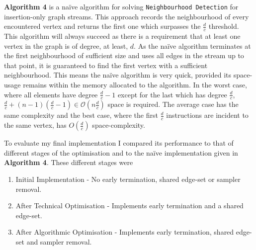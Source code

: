 \documentclass[11pt,twoside,a4paper]{report}
\begin{document}
\textbf{Algorithm 4} is a naïve algorithm for solving \texttt{Neighbourhood Detection} for insertion-only graph streams. This approach records the neighbourhood of every encountered vertex and returns the first one which surpasses the $\frac{d}c$ threshold. This algorithm will always succeed as there is a requirement that at least one vertex in the graph is of degree, at least, $d$. As the naïve algorithm terminates at the first neighbourhood of sufficient size and uses all edges in the stream up to that point, it is guaranteed to find the first vertex with a sufficient neighbourhood. This means the naïve algorithm is very quick, provided its space-usage remains within the memory allocated to the algorithm. In the worst case, where all elements have degree $\frac{d}c-1$ except for the last which has degree $\frac{d}c$, $\frac{d}{c}+(n-1)(\frac{d}c-1)\in \mathcal{O}(n\frac{d}c)$ space is required. The average case has the same complexity and the best case, where the first $\frac{d}c$ instructions are incident to the same vertex, has $O(\frac{d}c)$ space-complexity.

To evaluate my final implementation I compared its performance to that of different stages of the optimisation and to the naïve implementation given in \textbf{Algorithm 4}. These different stages were
\begin{enumerate}[label=\roman*)]
	\item Initial Implementation - No early termination, shared edge-set or sampler removal. %
	\item After Technical Optimisation - Implements early termination and a shared edge-set. %
	\item After Algorithmic Optimisation - Implements early termination, shared edge-set and sampler removal. %
\end{enumerate}
\end{document}
